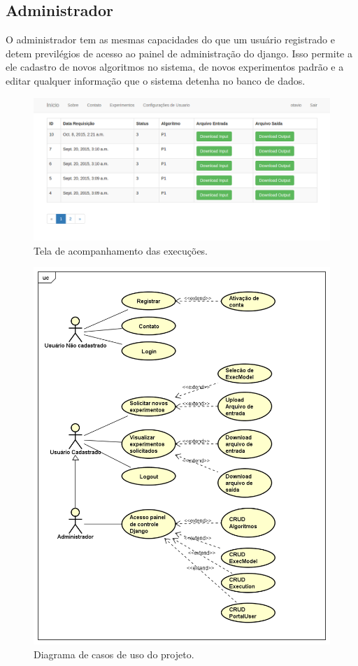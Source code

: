 \documentclass[tg]{mdtufsm}
\begin{document}
\subsection{Administrador}
O administrador tem as mesmas capacidades do que um usuário registrado e detem previlégios de acesso ao painel de administração do django. Isso permite a ele cadastro de novos algoritmos no sistema, de novos experimentos padrão e a editar qualquer informação que o sistema detenha no banco de dados.
\begin{figure}
	\centering
	\includegraphics[width=1\textwidth]{userhome}
	\caption{
		Tela de acompanhamento das execuções.
	}
	\label{fig:funcional}
\end{figure}
\begin{figure}
	\centering
	\includegraphics[width=1\textwidth]{UseCase_tg}
	\caption{
		Diagrama de casos de uso do projeto.
	}
	\label{fig:usecase}
\end{figure}
\end{document}
